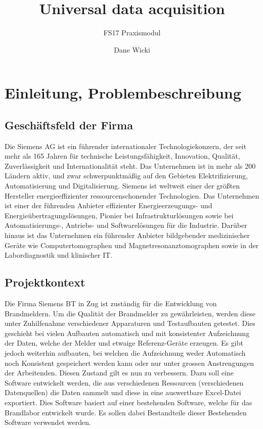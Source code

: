 \documentclass[10pt]{scrartcl}
\author{Dane Wicki}
\title{Universal data acquisition}
\subtitle{FS17 Praxismodul}
\begin{document}
\maketitle
\tableofcontents
\section{Einleitung, Problembeschreibung}
\subsection{Geschäftsfeld der Firma}
Die Siemens AG ist ein führender internationaler Technologiekonzern, der seit mehr als 165 Jahren für technische Leistungsfähigkeit, Innovation, Qualität, Zuverlässigkeit und Internationalität steht. Das Unternehmen ist in mehr als 200 Ländern aktiv, und zwar schwerpunktmäßig auf den Gebieten Elektrifizierung, Automatisierung und Digitalisierung. Siemens ist weltweit einer der größten Hersteller energieeffizienter ressourcenschonender Technologien. Das Unternehmen ist einer der führenden Anbieter effizienter Energieerzeugungs- und Energieübertragungslösungen, Pionier bei Infrastrukturlösungen sowie bei Automatisierungs-, Antriebs- und Softwarelösungen für die Industrie. Darüber hinaus ist das Unternehmen ein führender Anbieter bildgebender medizinischer Geräte wie Computertomographen und Magnetresonanztomographen sowie in der Labordiagnostik und klinischer IT. \cite{website:siemens}
\subsection{Projektkontext}
Die Firma Siemens BT in Zug ist zuständig für die Entwicklung von Brandmeldern.
Um die Qualität der Brandmelder zu gewährleisten, werden diese unter Zuhilfenahme
verschiedener Apparaturen und Testaufbauten getestet. Dies geschieht bei vielen Aufbauten automatisch und mit konsistenter Aufzeichnung der Daten, welche der Melder und etwaige Referenz-Geräte erzeugen. Es gibt jedoch weiterhin aufbauten, bei welchen die Aufzeichnung weder Automatisch noch Konsistent gespeichert werden kann oder nur unter grossen Anstrengungen der Arbeitenden. Diesen Zustand gilt es nun zu verbessern.
Dazu soll eine Software entwickelt werden, die aus verschiedenen Ressourcen (verschiedenen
Datenquellen) die Daten sammelt und diese in eine auswertbare Excel-Datei exportiert. Dies
Software basiert auf einer bestehenden Software, welche für das Brandlabor entwickelt wurde.
Es sollen dabei Bestandteile dieser Bestehenden Software verwendet werden.
\end{document}
